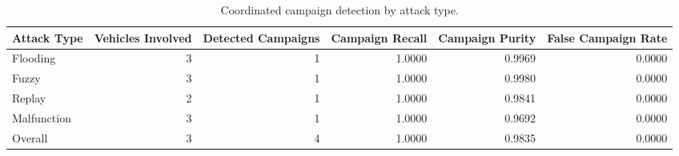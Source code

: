 \begin{table}[t]
\centering
\begin{tabular}{lrrrrr}
\toprule
Attack Type & Vehicles Involved & Detected Campaigns & Campaign Recall & Campaign Purity & False Campaign Rate \\
\midrule
Flooding & 3 & 1 & 1.0000 & 0.9969 & 0.0000 \\
Fuzzy & 3 & 1 & 1.0000 & 0.9980 & 0.0000 \\
Replay & 2 & 1 & 1.0000 & 0.9841 & 0.0000 \\
Malfunction & 3 & 1 & 1.0000 & 0.9692 & 0.0000 \\
Overall & 3 & 4 & 1.0000 & 0.9835 & 0.0000 \\
\bottomrule
\end{tabular}
\caption{Coordinated campaign detection by attack type.}
\label{tab:final-campaign-by-attack}
\end{table}
